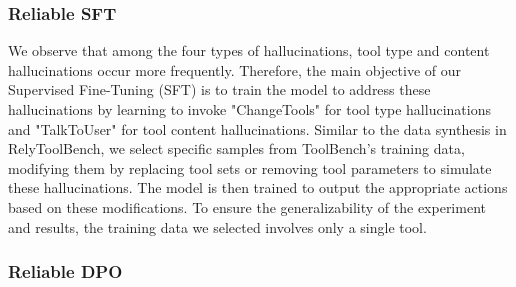 \subsubsection{Reliable SFT}



We observe that among the four types of hallucinations, tool type and content hallucinations occur more frequently. Therefore, the main objective of our Supervised Fine-Tuning (SFT) is to train the model to address these hallucinations by learning to invoke "ChangeTools" for tool type hallucinations and "TalkToUser" for tool content hallucinations. Similar to the data synthesis in RelyToolBench, we select specific samples from ToolBench's training data, modifying them by replacing tool sets or removing tool parameters to simulate these hallucinations. The model is then trained to output the appropriate actions based on these modifications. To ensure the generalizability of the experiment and results, the training data we selected involves only a single tool.

\subsubsection{Reliable DPO}

